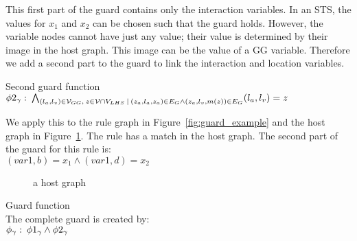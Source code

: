 This first part of the guard contains only the interaction variables. In an STS, the values for $x_1$ and $x_2$ can be chosen such that the guard holds. However, the variable nodes cannot have just any value; their value is determined by their image in the host graph. This image can be the value of a GG variable. Therefore we add a second part to the guard to link the interaction and location variables.
\vspace{10px}\begin{definition} Second guard function
\vspace{2px} \\
$\phi 2_{\gamma}:\: \bigwedge_{(l_a, l_v) \in \mathcal{V}_{GG},\: z \in \mathcal{V} \cap V_{LHS}\: |\: (z_a, l_a, z_a) \in E_{G} \land (z_a, l_v, m(z)) \in E_{G}} (l_a, l_v) = z$
\end{definition}
\vspace{10px}
We apply this to the rule graph in Figure~\ref{fig:guard_example} and the host graph in Figure~\ref{fig:guard_example_host}. The rule has a match in the host graph. The second part of the guard for this rule is:
\vspace{5px} \\
$(var1,b) = x_1 \land (var1,d) = x_2$

\begin{figure}[h]
  \begin{center}
    
  \end{center}
  \caption{a host graph}
  \label{fig:guard_example_host}
\end{figure}

\vspace{10px}\begin{definition} Guard function \\
The complete guard is created by:
\vspace{5px} \\
$\phi_{\gamma}:\:\phi 1_{\gamma} \land \phi 2_{\gamma}$
\end{definition}

